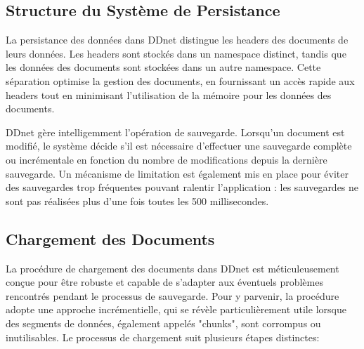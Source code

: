 \subsection{Structure du Système de Persistance}

La persistance des données dans \Gls{DDnet} distingue les headers des documents de leurs données. Les headers sont stockés dans un namespace distinct, tandis que les données des documents sont stockées dans un autre namespace. Cette séparation optimise la gestion des documents, en fournissant un accès rapide aux headers tout en minimisant l'utilisation de la mémoire pour les données des documents.

\Gls{DDnet} gère intelligemment l'opération de sauvegarde. Lorsqu'un document est modifié, le système décide s'il est nécessaire d'effectuer une sauvegarde complète ou incrémentale en fonction du nombre de modifications depuis la dernière sauvegarde. Un mécanisme de limitation est également mis en place pour éviter des sauvegardes trop fréquentes pouvant ralentir l'application : les sauvegardes ne sont pas réalisées plus d'une fois toutes les 500 millisecondes.

\subsection{Chargement des Documents}

La procédure de chargement des documents dans \Gls{DDnet} est méticuleusement conçue pour être robuste et capable de s'adapter aux éventuels problèmes rencontrés pendant le processus de sauvegarde. Pour y parvenir, la procédure adopte une approche incrémentielle, qui se révèle particulièrement utile lorsque des segments de données, également appelés "chunks", sont corrompus ou inutilisables. Le processus de chargement suit plusieurs étapes distinctes:


